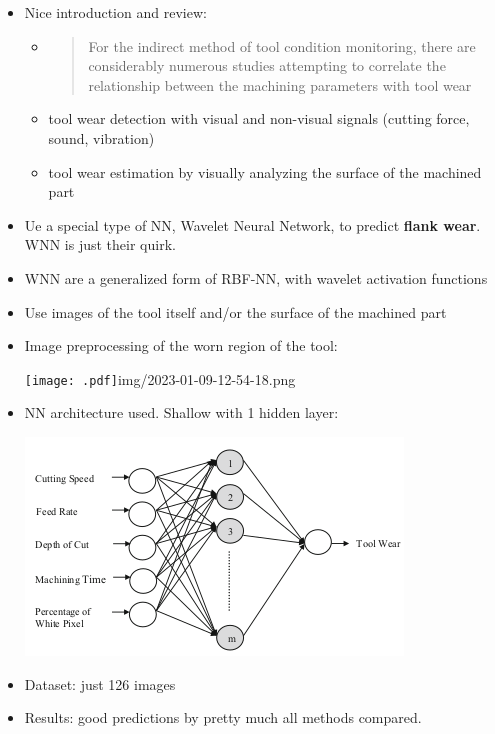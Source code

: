 \documentclass[
  letterpaper,
  DIV=11,
  numbers=noendperiod]{scrartcl}
\begin{document}
\begin{itemize}
\item
  Nice introduction and review:

  \begin{itemize}
  \item
    \begin{quote}
    For the indirect method of tool condition monitoring, there are
    considerably numerous studies attempting to correlate the
    relationship between the machining parameters with tool wear
    \end{quote}
  \item
    tool wear detection with visual and non-visual signals (cutting
    force, sound, vibration)
  \item
    tool wear estimation by visually analyzing the surface of the
    machined part
  \end{itemize}
\item
  Ue a special type of NN, Wavelet Neural Network, to predict
  \textbf{flank wear}. WNN is just their quirk.
\item
  WNN are a generalized form of RBF-NN, with wavelet activation
  functions
\item
  Use images of the tool itself and/or the surface of the machined part
\item
  Image preprocessing of the worn region of the tool:

  \texttt{[image: .pdf]}img/2023-01-09-12-54-18.png
\item
  NN architecture used. Shallow with 1 hidden layer:

  \includegraphics{img/2023-01-09-12-55-14.png}
\item
  Dataset: just 126 images
\item
  Results: good predictions by pretty much all methods compared.


\end{itemize}
\end{document}
